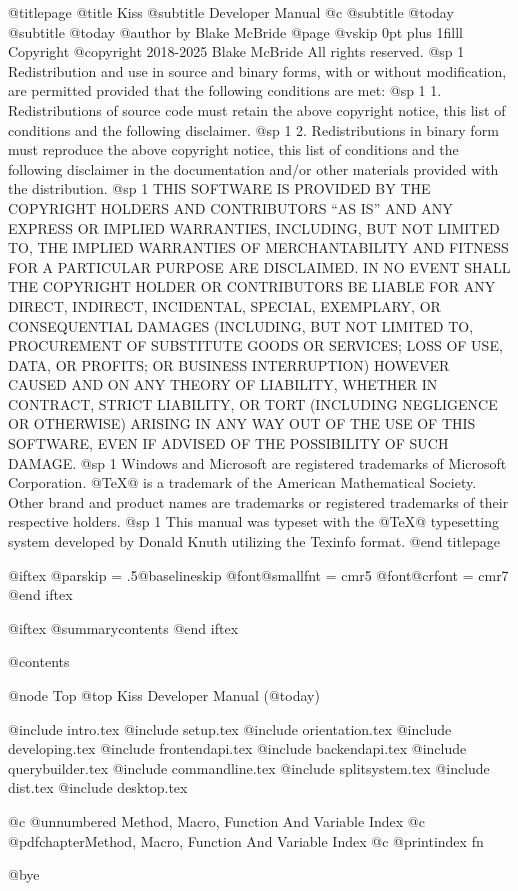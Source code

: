 @titlepage
@title Kiss
@subtitle Developer Manual
@c @subtitle @today{}
@subtitle @today{}
@author by Blake McBride
@page
@vskip 0pt plus 1filll
Copyright  @copyright{} 2018-2025 Blake McBride
All rights reserved.
@sp 1
Redistribution and use in source and binary forms, with or without
modification, are permitted provided that the following conditions are
met:
@sp 1
1. Redistributions of source code must retain the above copyright
notice, this list of conditions and the following disclaimer.
@sp 1
2. Redistributions in binary form must reproduce the above copyright
notice, this list of conditions and the following disclaimer in the
documentation and/or other materials provided with the distribution.
@sp 1
THIS SOFTWARE IS PROVIDED BY THE COPYRIGHT HOLDERS AND CONTRIBUTORS
``AS IS'' AND ANY EXPRESS OR IMPLIED WARRANTIES, INCLUDING, BUT NOT
LIMITED TO, THE IMPLIED WARRANTIES OF MERCHANTABILITY AND FITNESS FOR
A PARTICULAR PURPOSE ARE DISCLAIMED. IN NO EVENT SHALL THE COPYRIGHT
HOLDER OR CONTRIBUTORS BE LIABLE FOR ANY DIRECT, INDIRECT, INCIDENTAL,
SPECIAL, EXEMPLARY, OR CONSEQUENTIAL DAMAGES (INCLUDING, BUT NOT
LIMITED TO, PROCUREMENT OF SUBSTITUTE GOODS OR SERVICES; LOSS OF USE,
DATA, OR PROFITS; OR BUSINESS INTERRUPTION) HOWEVER CAUSED AND ON ANY
THEORY OF LIABILITY, WHETHER IN CONTRACT, STRICT LIABILITY, OR TORT
(INCLUDING NEGLIGENCE OR OTHERWISE) ARISING IN ANY WAY OUT OF THE USE
OF THIS SOFTWARE, EVEN IF ADVISED OF THE POSSIBILITY OF SUCH DAMAGE.
@sp 1
Windows and Microsoft are registered trademarks of
Microsoft Corporation.  @TeX{}@ is a trademark of the American
Mathematical Society. Other brand and product names are trademarks or
registered trademarks of their respective holders.
@sp 1
This manual was typeset with the @TeX{}@ typesetting system developed by
Donald Knuth utilizing the Texinfo format.
@end titlepage

@iftex
@parskip = .5@baselineskip
@font@smallfnt = cmr5
@font@crfont = cmr7
@end iftex

@iftex
@summarycontents
@end iftex

@contents

@node Top
@top Kiss Developer Manual (@today{})

@include intro.tex
@include setup.tex
@include orientation.tex
@include developing.tex
@include frontendapi.tex
@include backendapi.tex
@include querybuilder.tex
@include commandline.tex
@include splitsystem.tex
@include dist.tex
@include desktop.tex

@c @unnumbered Method, Macro, Function And Variable Index
@c @pdfchapter{Method, Macro, Function And Variable Index}
@c @printindex fn

@bye

